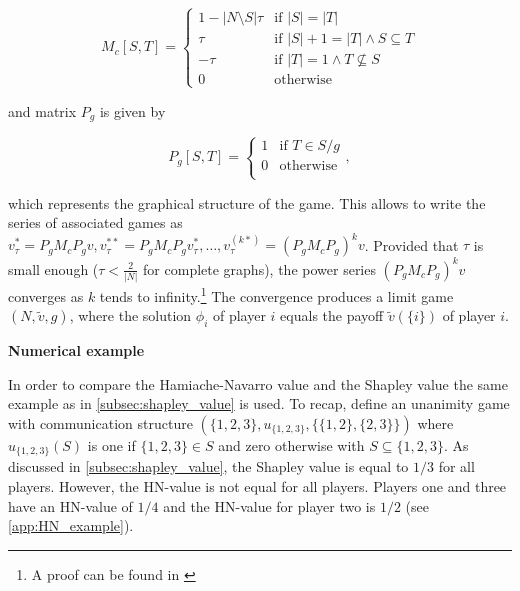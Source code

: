 \begin{equation}
	M_c[S, T] =
	\begin{cases}
		1 - |N \setminus S| \tau & \text{if } |S| = |T|                         \\
		\tau                     & \text{if } |S| + 1 = |T| \land S \subseteq T \\
		-\tau                    & \text{if } |T| = 1  \land T \not \subseteq S \\
		0                        & \text{otherwise}
	\end{cases}
\end{equation}


and matrix $P_g$ is given by

\begin{equation}
	P_g[S, T] =
	\begin{cases}
		1 & \text{if } T \in S/g \\
		0 & \text{otherwise}     \\
	\end{cases}
	,
\end{equation}


which represents the graphical structure of the game. This allows to write the series of associated
games as $v^*_\tau = P_g M_c P_g v, v^{**}_\tau = P_g M_c P_g v^*_\tau, \dots, v^{(k*)}_\tau = \left(P_g M_c P_g\right)^k v$.
Provided that $\tau$ is small enough ($\tau < \frac{2}{|N|}$ for complete graphs\cite{hamiache2001associated}),
the power series $\left(P_g M_c P_g\right)^k v$ converges as $k$ tends to infinity.\footnote{A proof can be found in \cite{hamiache_associated_2020}}
The convergence produces a limit game $(N, \tilde{v}, g)$, where the solution $\phi_i$ of player $i$ equals the
payoff $\tilde{v}(\{i\})$ of player $i$.\cite{zhang2022gstarx, hamiache_associated_2020}


\textbf{Numerical example}

In order to compare the Hamiache-Navarro value and the Shapley value the same example as in \cref{subsec:shapley_value}
is used. To recap, define an unanimity game with communication structure $(\{1, 2, 3\}, u_{\{1, 2, 3\}}, \{\{1, 2\}, \{2, 3\}\})$
where $u_{\{1, 2, 3\}}(S)$ is one if $\{1, 2, 3\} \in S$ and zero otherwise with $S \subseteq \{1, 2, 3\}$. As discussed
in \cref{subsec:shapley_value}, the Shapley value is equal to $1/3$ for all players. However, the HN-value is not equal
for all players. Players one and three have an HN-value of $1/4$ and the HN-value for player two is $1/2$ 
(see \cref{app:HN_example}).\cite{hamiache_associated_2020}
